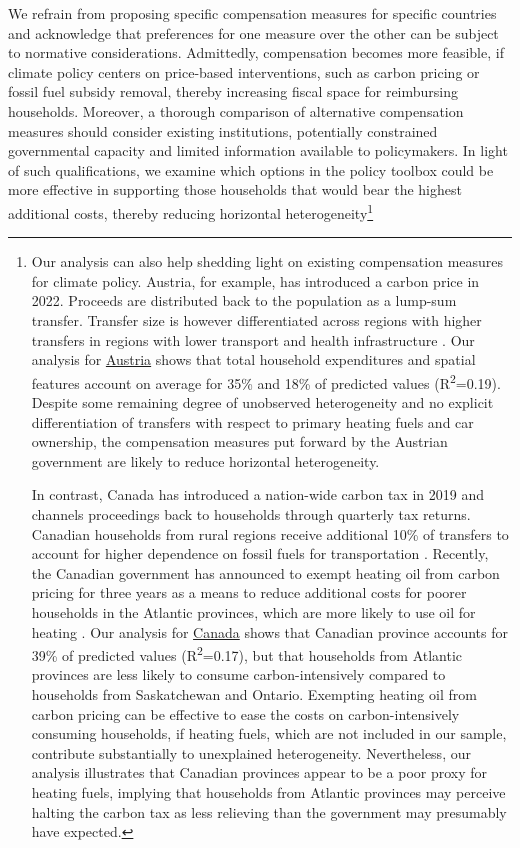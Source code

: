 \documentclass[12pt, a4paper]{article}
\begin{document}
We refrain from proposing specific compensation measures for specific countries and acknowledge that preferences for one measure over the other can be subject to normative considerations. Admittedly, compensation becomes more feasible, if climate policy centers on price-based interventions, such as carbon pricing or fossil fuel subsidy removal, thereby increasing fiscal space for reimbursing households. Moreover, a thorough comparison of alternative compensation measures should consider existing institutions, potentially constrained governmental capacity and limited information available to policymakers. In light of such qualifications, we examine which options in the policy toolbox could be more effective in supporting those households that would bear the highest additional costs, thereby reducing horizontal heterogeneity\footnote{Our analysis can also help shedding light on existing compensation measures for climate policy. Austria, for example, has introduced a carbon price in 2022. Proceeds are distributed back to the population as a lump-sum transfer. Transfer size is however differentiated across regions with higher transfers in regions with lower transport and health infrastructure \autocite{BMK.2023}. Our analysis for \hyperref[fig:5b_AUT]{Austria} shows that total household expenditures and spatial features account on average for 35\% and 18\% of predicted values (R\textsuperscript{2}=0.19). Despite some remaining degree of unobserved heterogeneity and no explicit differentiation of transfers with respect to primary heating fuels and car ownership, the compensation measures put forward by the Austrian government are likely to reduce horizontal heterogeneity.

In contrast, Canada has introduced a nation-wide carbon tax in 2019 and channels proceedings back to households through quarterly tax returns. Canadian households from rural regions receive additional 10\% of transfers to account for higher dependence on fossil fuels for transportation \autocite{GovernmentofCanada.2023}. Recently, the Canadian government has announced to exempt heating oil from carbon pricing for three years as a means to reduce additional costs for poorer households in the Atlantic provinces, which are more likely to use oil for heating \autocite{Reuters.2023}. Our analysis for \hyperref[fig:5b_CAN]{Canada} shows that Canadian province accounts for 39\% of predicted values (R\textsuperscript{2}=0.17), but that households from Atlantic provinces are less likely to consume carbon-intensively compared to households from Saskatchewan and Ontario. Exempting heating oil from carbon pricing can be effective to ease the costs on carbon-intensively consuming households, if heating fuels, which are not included in our sample, contribute substantially to unexplained heterogeneity. Nevertheless, our analysis illustrates that Canadian provinces appear to be a poor proxy for heating fuels, implying that households from Atlantic provinces may perceive halting the carbon tax as less relieving than the government may presumably have expected.}
\end{document}
